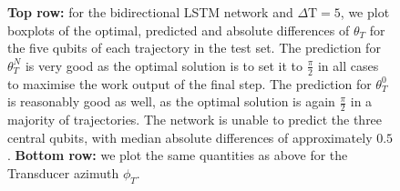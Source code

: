 \begin{figure}
\begin{subfigure}{0.32\textwidth}
\end{subfigure}
\caption{\textbf{Top row:} for the bidirectional LSTM network and $\Delta \mathrm{T} = 5$, we plot boxplots of the optimal, predicted and absolute differences of $\theta_T$ for the five qubits of each trajectory in the test set. The prediction for $\theta_T^N$ is very good as the optimal solution is to set it to $\frac{\pi}{2}$ in all cases to maximise the work output of the final step. The prediction for $\theta_T^0$ is reasonably good as well, as the optimal solution is again $\frac{\pi}{2}$ in a majority of trajectories. The network is unable to predict the three central qubits, with median absolute differences of approximately $0.5$. \textbf{Bottom row:} we plot the same quantities as above for the Transducer azimuth $\phi_T$.}
\label{bilstmbox}
\end{figure}